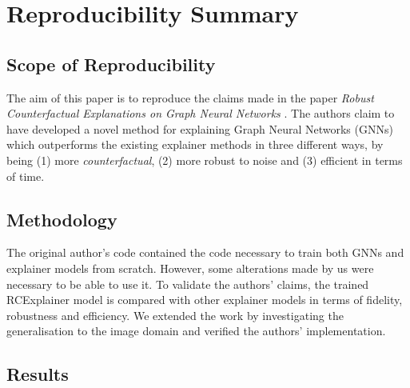 \section{Reproducibility Summary}


\subsection*{Scope of Reproducibility}
The aim of this paper is to reproduce the claims made in the paper \textit{Robust Counterfactual Explanations on Graph Neural Networks} \cite{bajaj2021robust}. The authors claim to have developed a novel method for explaining Graph Neural Networks (GNNs) which outperforms the existing explainer methods in three different ways, by being (1) more \textit{counterfactual}, (2) more robust to noise and (3) efficient in terms of time.

\subsection*{Methodology}

The original author's code contained the code necessary to train both GNNs and explainer models from scratch. However, some alterations made by us were necessary to be able to use it. To validate the authors' claims, the trained RCExplainer model is compared with other explainer models in terms of fidelity, robustness and efficiency. We extended the work by investigating the generalisation to the image domain and verified the authors' implementation.


\subsection*{Results}


